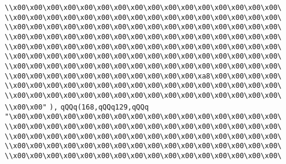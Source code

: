 \verb|\\x00\x00\x00\x00\x00\x00\x00\x00\x00\x00\x00\x00\x00\x00\x00\x00\|\newline
\verb|\\x00\x00\x00\x00\x00\x00\x00\x00\x00\x00\x00\x00\x00\x00\x00\x00\|\newline
\verb|\\x00\x00\x00\x00\x00\x00\x00\x00\x00\x00\x00\x00\x00\x00\x00\x00\|\newline
\verb|\\x00\x00\x00\x00\x00\x00\x00\x00\x00\x00\x00\x00\x00\x00\x00\x00\|\newline
\verb|\\x00\x00\x00\x00\x00\x00\x00\x00\x00\x00\x00\x00\x00\x00\x00\x00\|\newline
\verb|\\x00\x00\x00\x00\x00\x00\x00\x00\x00\x00\x00\x00\x00\x00\x00\x00\|\newline
\verb|\\x00\x00\x00\x00\x00\x00\x00\x00\x00\x00\x00\x00\x00\x00\x00\x00\|\newline
\verb|\\x00\x00\x00\x00\x00\x00\x00\x00\x00\x00\x00\xa8\x00\x00\x00\x00\|\newline
\verb|\\x00\x00\x00\x00\x00\x00\x00\x00\x00\x00\x00\x00\x00\x00\x00\x00\|\newline
\verb|\\x00\x00\x00\x00\x00\x00\x00\x00\x00\x00\x00\x00\x00\x00\x00\x00\|\newline
\verb|\\x00\x00"|\newline
\verb|),|\newline
\verb|qQQq(168,qQQq129,qQQq|\newline
\verb|"\x00\x00\x00\x00\x00\x00\x00\x00\x00\x00\x00\x00\x00\x00\x00\x00\|\newline
\verb|\\x00\x00\x00\x00\x00\x00\x00\x00\x00\x00\x00\x00\x00\x00\x00\x00\|\newline
\verb|\\x00\x00\x00\x00\x00\x00\x00\x00\x00\x00\x00\x00\x00\x00\x00\x00\|\newline
\verb|\\x00\x00\x00\x00\x00\x00\x00\x00\x00\x00\x00\x00\x00\x00\x00\x00\|\newline
\verb|\\x00\x00\x00\x00\x00\x00\x00\x00\x00\x00\x00\x00\x00\x00\x00\x00\|\newline
